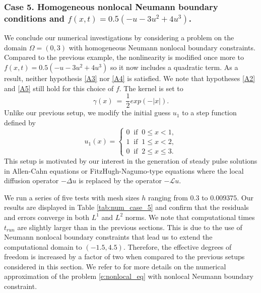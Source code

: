 \documentclass[11pt]{amsart}   	%
\theoremstyle{plain}
\numberwithin{equation}{section}
\begin{document}
\subsubsection{Case 5. Homogeneous nonlocal Neumann boundary conditions and $f(x,t)=0.5(-u - 3 u^2 + 4 u^3)$.}

We conclude our numerical investigations by considering a problem on the domain $\Omega=(0,3)$ with homogeneous Neumann nonlocal boundary constraints. Compared to the previous example, the nonlinearity is modified once more to $f(x,t)=0.5(-u - 3 u^2 + 4 u^3)$ so it now includes a quadratic term. As a result, neither hypothesis \ref{A3} nor \ref{A4} is satisfied. We note that hypotheses \ref{A2} and \ref{A5} still hold for this choice of $f$. The kernel is set to
$$ \gamma(x) \ = \ \frac{1}{2} exp(-|x|).$$
Unlike our previous setup, we modify the initial guess $u_1$ to a step function defined by
$$
u_1(x) =
\begin{cases}
0 \ \text{ if } \ 0 \leq x < 1, \\
1 \ \text{ if } \ 1 \leq x < 2, \\
0 \ \text{ if } \ 2 \leq x \leq 3 . 
\end{cases}
$$
This setup is motivated by our interest in the generation of steady pulse solutions in Allen-Cahn equations or FitzHugh-Nagumo-type equations where the local diffusion operator $-\Delta u$ is replaced by the operator $-\mathcal{L}u$.

We run a series of five tests with mesh sizes $h$ ranging from $0.3$ to $0.009375$. Our results are displayed in Table \ref{tab:num_case_5} and confirm that the residuals and errors converge in both $L^1$ and $L^2$ norms.
We note that computational times $t_{run}$ are slightly larger than in the previous sections. This is due to the use of Neumann nonlocal boundary constraints that lead us to extend the computational domain to $(-1.5,4.5)$. Therefore, the effective degrees of freedom is increased by a factor of two when compared to the previous setups considered in this section. We refer to \cite{cappanera2024analysis} for more details on the numerical approximation of the problem \ref{e:nonlocal_eq} with nonlocal Neumann boundary constraint.
\end{document}
